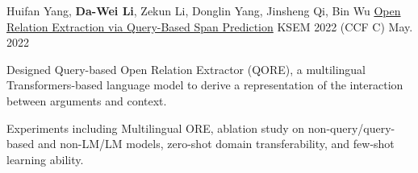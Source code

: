 \begin{cventries}
  \cventry
    {Huifan Yang, \textbf{Da-Wei Li}, Zekun Li, Donglin Yang, Jinsheng Qi, Bin Wu} %
    {\href{https://www.easychair.org/publications/preprint_open/lLmV}{Open Relation Extraction via Query-Based Span Prediction}} %
    {KSEM 2022 (CCF C)} %
    {May. 2022} %
    {
      \begin{cvitems} %
        \item {Designed Query-based Open Relation Extractor (QORE), a multilingual Transformers-based language model to derive a representation of the interaction between arguments and context.}
        \item {Experiments including Multilingual ORE, ablation study on non-query/query-based and non-LM/LM models, zero-shot domain transferability, and few-shot learning ability.}
      \end{cvitems}
    }

\end{cventries}
